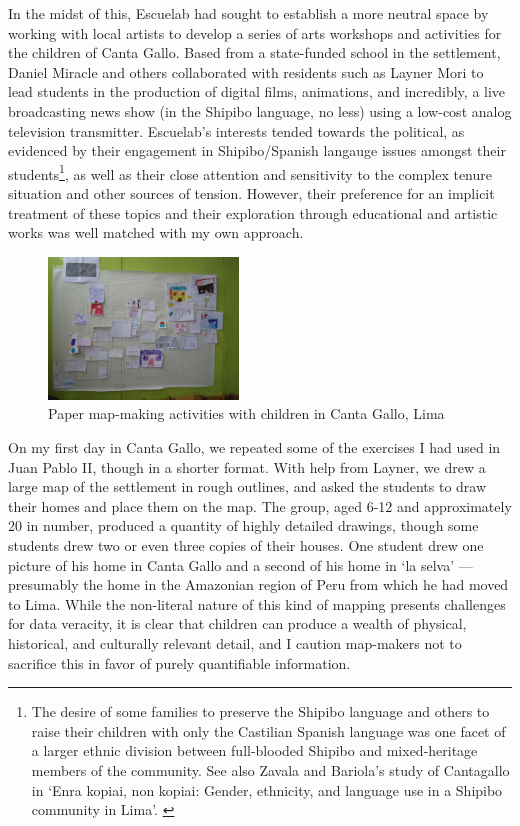 \documentclass[11pt,oneside,notitlepage]{report}
\begin{document}
In the midst of this, Escuelab had sought to establish a more neutral space by working with local artists to develop a series of arts workshops and activities for the children of Canta Gallo. Based from a state-funded school in the settlement, Daniel Miracle and others collaborated with residents such as Layner Mori to lead students in the production of digital films, animations, and incredibly, a live broadcasting news show (in the Shipibo language, no less) using a low-cost analog television transmitter. Escuelab's interests tended towards the political, as evidenced by their engagement in Shipibo/Spanish langauge issues amongst their students\footnote{The desire of some families to preserve the Shipibo language and others to raise their children with only the Castilian Spanish language was one facet of a larger ethnic division between full-blooded Shipibo and mixed-heritage members of the community. See also Zavala and Bariola's study of Cantagallo in `Enra kopiai, non kopiai: Gender, ethnicity, and language use in a Shipibo community in Lima'. \cite{bariola2008gender}}, as well as their close attention and sensitivity to the complex tenure situation and other sources of tension. However, their preference for an implicit treatment of these topics and their exploration through educational and artistic works was well matched with my own approach.

\begin{figure}
	\begin{flushright}
		\includegraphics[width=0.45\textwidth]{images/canta-gallo-drawn-map.jpg}
		\caption{Paper map-making activities with children in Canta Gallo, Lima}
	\end{flushright}
\end{figure}

On my first day in Canta Gallo, we repeated some of the exercises I had used in Juan Pablo II, though in a shorter format. With help from Layner, we drew a large map of the settlement in rough outlines, and asked the students to draw their homes and place them on the map. The group, aged 6-12 and approximately 20 in number, produced a quantity of highly detailed drawings, though some students drew two or even three copies of their houses. One student drew one picture of his home in Canta Gallo and a second of his home in `la selva' --- presumably the home in the Amazonian region of Peru from which he had moved to Lima. While the non-literal nature of this kind of mapping presents challenges for data veracity, it is clear that children can produce a wealth of physical, historical, and culturally relevant detail, and I caution map-makers not to sacrifice this in favor of purely quantifiable information. 
\end{document}
